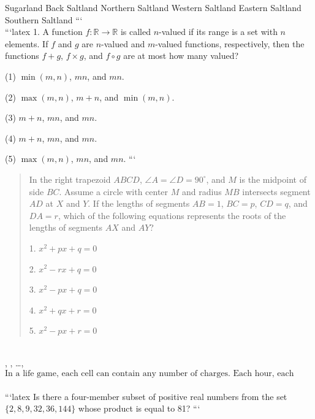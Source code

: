 Sugarland
Back Saltland
Northern Saltland
Western Saltland
Eastern Saltland
Southern Saltland
```
\\
```latex
1. A function $f: \mathbb{R} \to \mathbb{R}$ is called $n$-valued if its range is a set with $n$ elements. If $f$ and $g$ are $n$-valued and $m$-valued functions, respectively, then the functions $f+g$, $f \times g$, and $f \circ g$ are at most how many valued?

(1) $\min(m, n)$, $mn$, and $mn$.

(2) $\max(m, n)$, $m+n$, and $\min(m, n)$.

(3) $m+n$, $mn$, and $mn$.

(4) $m+n$, $mn$, and $mn$.

(5) $\max(m, n)$, $mn$, and $mn$.
```
\\
\begin{quote}
In the right trapezoid $ABCD$, $\angle A = \angle D = 90^\circ$, and $M$ is the midpoint of side $BC$. Assume a circle with center $M$ and radius $MB$ intersects segment $AD$ at $X$ and $Y$. If the lengths of segments $AB = 1$, $BC = p$, $CD = q$, and $DA = r$, which of the following equations represents the roots of the lengths of segments $AX$ and $AY$?

1. $x^2 + px + q = 0$

2. $x^2 - rx + q = 0$

3. $x^2 - px + q = 0$

4. $x^2 + qx + r = 0$

5. $x^2 - px + r = 0$
\end{quote}
\\
 , , \ldots,  
\\
\[
\text{In a life game, each cell can contain any number of charges. Each hour, each charge is divided into four charges, and each is moved to one of the four adjacent cells. If initially there is only one charge, how many charges will there be after six hours? (Assume that the grid is such that each cell shares a vertex with the initial cell, and after one hour, there will be exactly one charge in each of the four adjacent cells to the starting cell.)}
\]
\\
```latex
Is there a four-member subset of positive real numbers from the set $\{2, 8, 9, 32, 36, 144\}$ whose product is equal to 81?
```
\\
